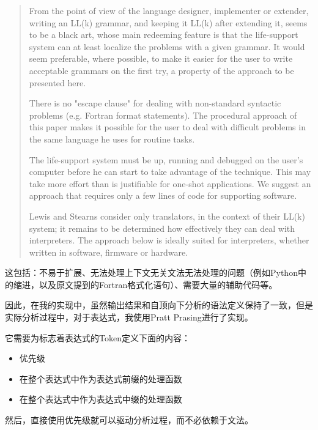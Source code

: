 \documentclass[a4paper,twoside]{article}
\begin{document}
\begin{spacing}{1.2}
\begin{quotation}
From the point of view of the language designer, implementer or extender, writing an LL(k) grammar, and keeping it LL(k) after extending it, seems to be a black art, whose main redeeming feature is that the life-support system can at least localize the problems with a given grammar. It would seem preferable, where possible, to make it easier for the user to write acceptable grammars on the first try, a property of the approach to be presented here.

There is no "escape clause" for dealing with non-standard syntactic problems (e.g. Fortran format statements). The procedural approach of this paper makes it possible for the user to deal with difficult problems in the same language he uses for routine tasks.

The life-support system must be up, running and debugged on the user's computer before he can start to take advantage of the technique. This may take more effort than is justifiable for one-shot applications. We suggest an approach that requires only a few lines of code for supporting software.

Lewis and Stearns consider only translators, in the context of their LL(k) system; it remains to be determined how effectively they can deal with interpreters. The approach below is ideally suited for interpreters, whether written in software, firmware or hardware.
\end{quotation}
这包括：不易于扩展、无法处理上下文无关文法无法处理的问题（例如Python中的缩进，以及原文提到的Fortran格式化语句）、需要大量的辅助代码等。

因此，在我的实现中，虽然输出结果和自顶向下分析的语法定义保持了一致，但是实际分析过程中，对于表达式，我使用Pratt Prasing进行了实现。

它需要为标志着表达式的Token定义下面的内容：
\begin{itemize}
	\item 优先级
	\item 在整个表达式中作为表达式前缀的处理函数
	\item 在整个表达式中作为表达式中缀的处理函数
\end{itemize}

然后，直接使用优先级就可以驱动分析过程，而不必依赖于文法。


\end{spacing}
\end{document}
